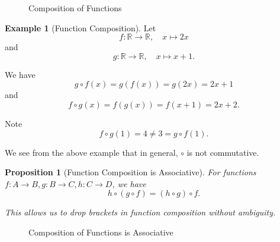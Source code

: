 \documentclass{article}
\newtheorem{proposition}[theorem]{Proposition}
\theoremstyle{definition}
\newtheorem{example}[theorem]{Example}
\theoremstyle{remark}
\newcommand{\pqty}[1]{\left(#1\right)}
\newcommand{\functiondomain}[3]{#1:#2\to #3}
\newcommand{\function}[5]{#1:#2\to #3,\quad #4\mapsto #5}
\newcommand{\RR}{\mathbb{R}}
\begin{document}
\begin{figure}[ht!]
    \centering
    \caption{Composition of Functions}
    \label{fig:composition-functions}
\end{figure}

\begin{example}[Function Composition]
    Let
    \[
        \function{f}{\RR}{\RR}{x}{2x}
    \]
    and
    \[
        \function{g}{\RR}{\RR}{x}{x + 1}.
    \]

    We have
    \[
        g \circ f \pqty{x} = g \pqty{f \pqty{x}} = g \pqty{2x} = 2x + 1
    \]
    and
    \[
        f \circ g \pqty{x} = f \pqty{g \pqty{x}} = f \pqty{x + 1} = 2x + 2.
    \]

    Note
    \[
        f \circ g \pqty{1} = 4 \neq 3 = g \circ f \pqty{1}.
    \]  
\end{example}

We see from the above example that in general, \(\circ\) is not commutative.

\begin{proposition}[Function Composition is Associative]
    For functions \(\functiondomain{f}{A}{B}, \functiondomain{g}{B}{C}, \functiondomain{h}{C}{D}\), we have
    \[
        h \circ \pqty{g \circ f} = \pqty{h \circ g} \circ f.
    \]

    This allows us to drop brackets in function composition without ambiguity.
\end{proposition}

\begin{figure}[ht!]
    \centering
    \caption{Composition of Functions is Associative}
    \label{fig:composition-functions-associative}
\end{figure}
\end{document}
